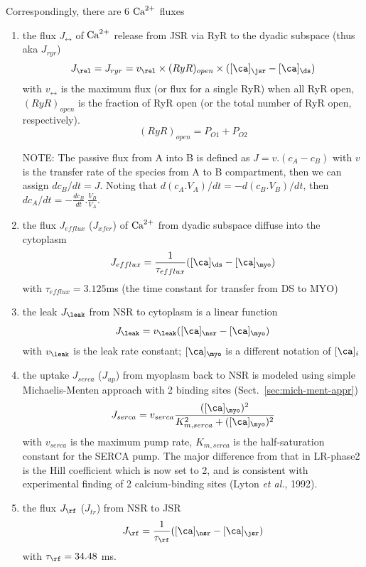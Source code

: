 Correspondingly, there are 6 ${\text{Ca}^{2+}}$ fluxes
\begin{enumerate}
\item the flux $J_\rel$ of ${\text{Ca}^{2+}}$ release from JSR via RyR to the
  dyadic subspace (thus aka $J_{ryr}$)
  \begin{equation}
    \label{eq:785}
    J_\rel = J_{ryr} = v_\rel\times (RyR)_{open}\times ([\ca]_\jsr - [\ca]_\ds)
  \end{equation}
  with $v_\rel$ is the maximum flux (or flux for a single RyR) when
  all RyR open, $(RyR)_{open}$ is the fraction of RyR open (or the
  total number of RyR open, respectively). 
  \begin{equation}
    \label{eq:786}
    (RyR)_{open} = P_{O1} + P_{O2}
  \end{equation}

  \begin{framed}
    NOTE: The passive flux from A into B is defined as $J=v.(c_A-c_B)$
    with $v$ is the transfer rate of the species from A to B
    compartment, then we can assign $dc_B/dt=J$. Noting that
    $d(c_A.V_A)/dt=-d(c_B.V_B)/dt$, then $dc_A/dt =
    -\frac{dc_B}{dt}.\frac{V_B}{V_A}$.
  \end{framed}
\item the flux $J_{efflux}$ ($J_{xfer}$) of ${\text{Ca}^{2+}}$ from dyadic
  subspace diffuse into the cytoplasm
  \begin{equation}
    \label{eq:789}
    J_{efflux} = \frac{1}{\tau_{efflux}} ([\ca]_\ds-[\ca]_\myo)
  \end{equation}
  with $\tau_{efflux}=3.125$ms (the time constant for transfer from DS
  to MYO)

\item the leak $J_\leak$ from NSR to cytoplasm is a linear function
  \begin{equation}
    \label{eq:787}
    J_\leak = v_\leak ([\ca]_\nsr - [\ca]_\myo)
  \end{equation}
  with $v_\leak$ is the leak rate constant; $[\ca]_\myo$ is a
  different notation of $[\ca]_i$

\item the uptake $J_{serca}$ ($J_{up}$) from myoplasm back to NSR is
  modeled using simple Michaelis-Menten approach with 2 binding sites
  (Sect.~\ref{sec:mich-ment-appr})
  \begin{equation}
    \label{eq:788}
    J_{serca} = v_{serca} \frac{([\ca]_\myo)^2}{K^2_{m,serca}+([\ca]_\myo)^2}
  \end{equation}
  with $v_{serca}$ is the maximum pump rate, $K_{m,serca}$ is the
  half-saturation constant for the SERCA pump. The major difference
  from that in LR-phase2 is the Hill coefficient which is now set to
  2, and is consistent with experimental finding of 2 calcium-binding
  sites (Lyton {\it et al.}, 1992).

\item the flux $J_\rf$ ($J_{tr}$) from NSR to JSR
  \begin{equation}
    \label{eq:790}
    J_\rf = \frac{1}{\tau_\rf} ([\ca]_\nsr-[\ca]_\jsr)
  \end{equation}
  with $\tau_\rf = 34.48$ ms. 

\end{enumerate}

